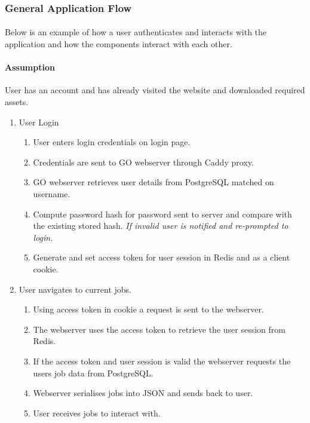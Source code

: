 \subsubsection{General Application Flow}
\paragraph{}
Below is an example of how a user authenticates and interacts with the application and how the components interact with each other.

\paragraph{Assumption}
User has an account and has already visited the website and downloaded required assets.
\begin{enumerate}
    \item User Login
    \begin{enumerate}
        \item User enters login credentials on login page.
        \item Credentials are sent to GO webserver through Caddy proxy.
        \item GO webserver retrieves user details from PostgreSQL matched on username.
        \item Compute password hash for password sent to server and compare with the existing stored hash. \emph{If invalid user is notified and re-prompted to login.}
        \item Generate and set access token for user session in Redis and as a client cookie.
    \end{enumerate}
    \item User navigates to current jobs.
    \begin{enumerate}
        \item Using access token in cookie a request is sent to the webserver.
        \item The webserver uses the access token to retrieve the user session from Redis.
        \item If the access token and user session is valid the webserver requests the users job data from PostgreSQL.
        \item Webserver serialises jobs into JSON and sends back to user.
        \item User receives jobs to interact with.
    \end{enumerate}
\end{enumerate}


